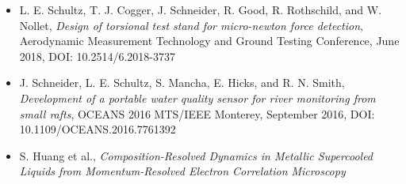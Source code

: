 \begin{itemize}
    \item L. E. Schultz, T. J. Cogger, J. Schneider, R. Good, R. Rothschild, and W. Nollet, \textit{Design of torsional test stand for micro-newton force detection}, Aerodynamic Measurement Technology and Ground Testing Conference, June 2018, DOI: 10.2514/6.2018-3737
    \item J. Schneider, L. E. Schultz, S. Mancha, E. Hicks, and R. N. Smith, \textit{Development of a portable water quality sensor for river monitoring from small rafts}, OCEANS 2016 MTS/IEEE Monterey, September 2016, DOI: 10.1109/OCEANS.2016.7761392
    \item S. Huang et al., \textit{Composition-Resolved Dynamics in Metallic Supercooled Liquids from Momentum-Resolved Electron Correlation Microscopy}
\end{itemize}
